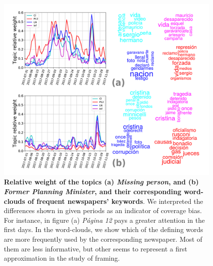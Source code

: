 \documentclass{bmcart}
\begin{document}
\begin{backmatter}
\begin{figure}[h!]
\includegraphics[width = \textwidth]{Fig7.pdf}
\caption{\textbf{Relative weight of the topics (a) \emph{Missing person}, and (b) \emph{Former Planning Minister}, and their corresponding word-clouds of frequent newspapers' keywords}. We interpreted the differences shown in given periods as an indicator of coverage bias. For instance, in figure (a) \emph{P\'agina 12} pays a greater attention in the first days. In the word-clouds, we show which of the defining words are more frequently used by the corresponding newspaper. Most of them are less informative, but other seems to represent a first approximation in the study of framing.}
\label{fig:topics_temporal_profiles}
\end{figure}


\end{backmatter}
\end{document}
